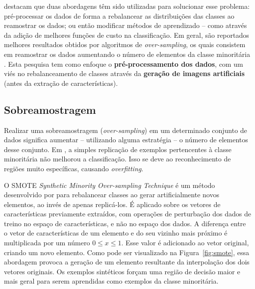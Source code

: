 \cite{Castro2011} destacam que duas abordagens têm sido utilizadas para solucionar esse problema: pré-processar os dados de forma a rebalancear as distribuições das classes ao reamostrar os dados; ou então modificar métodos de aprendizado -- como através da adição de melhores funções de custo na classificação. Em geral, são reportados melhores resultados obtidos por algoritmos de \textit{over-sampling}, os quais consistem em reamostrar os dados aumentando o número de elementos da classe minoritária \cite{Batista2004}. Esta pesquisa tem como enfoque o \textbf{pré-processamento dos dados}, com um viés no rebalanceamento de classes através da \textbf{geração de imagens artificiais} (antes da extração de características).

\subsection{Sobreamostragem}
\label{sec:smote}

Realizar uma sobreamostragem (\textit{over-sampling}) em um determinado conjunto de dados significa aumentar -- utilizando alguma estratégia -- o número de elementos desse conjunto. Em \cite{Chawla2002}, a simples replicação de exemplos pertencentes à classe minoritária não melhorou a classificação. Isso se deve ao reconhecimento de regiões muito específicas, causando \textit{overfitting}.

O SMOTE \textit{Synthetic Minority Over-sampling Technique} é um método desenvolvido por \cite{Chawla2002} para rebalancear classes ao gerar artificialmente novos elementos, ao invés de apenas replicá-los. É aplicado sobre os vetores de características previamente extraídos, com operações de perturbação dos dados de treino no espaço de características, e não no espaço dos dados. A diferença entre o vetor de características de um elemento e do seu vizinho mais próximo é multiplicada por um número $0 \le  x \le 1$. Esse valor é adicionado ao vetor original, criando um novo elemento. Como pode ser visualizado na Figura~\ref{fig:smote}, essa abordagem provoca a geração de um elemento resultante da interpolação dos dois vetores originais. Os exemplos sintéticos forçam uma região de decisão maior e mais geral para serem aprendidas como exemplos da classe minoritária.

